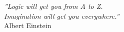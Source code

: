 \cleardoublepage
\thispagestyle{plain}

\vspace*{8cm}

\begin{flushright}
   \textsl{''Logic will get you from A to Z.\\
           Imagination will get you everywhere.''} \\
\vspace*{1.5cm}
           Albert Einstein
\end{flushright}
